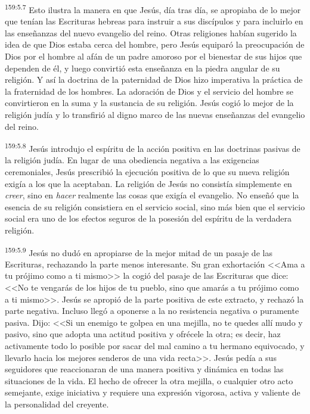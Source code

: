\par 
\textsuperscript{159:5.7} Esto ilustra la manera en que Jesús, día tras día, se apropiaba de lo mejor que tenían las Escrituras hebreas para instruir a sus discípulos y para incluirlo en las enseñanzas del nuevo evangelio del reino. Otras religiones habían sugerido la idea de que Dios estaba cerca del hombre, pero Jesús equiparó la preocupación de Dios por el hombre al afán de un padre amoroso por el bienestar de sus hijos que dependen de él, y luego convirtió esta enseñanza en la piedra angular de su religión. Y así la doctrina de la paternidad de Dios hizo imperativa la práctica de la fraternidad de los hombres. La adoración de Dios y el servicio del hombre se convirtieron en la suma y la sustancia de su religión. Jesús cogió lo mejor de la religión judía y lo transfirió al digno marco de las nuevas enseñanzas del evangelio del reino.

\par 
\textsuperscript{159:5.8} Jesús introdujo el espíritu de la acción positiva en las doctrinas pasivas de la religión judía. En lugar de una obediencia negativa a las exigencias ceremoniales, Jesús prescribió la ejecución positiva de lo que su nueva religión exigía a los que la aceptaban. La religión de Jesús no consistía simplemente en \textit{creer}, sino en \textit{hacer} realmente las cosas que exigía el evangelio. No enseñó que la esencia de su religión consistiera en el servicio social, sino más bien que el servicio social era uno de los efectos seguros de la posesión del espíritu de la verdadera religión.

\par 
\textsuperscript{159:5.9} Jesús no dudó en apropiarse de la mejor mitad de un pasaje de las Escrituras, rechazando la parte menos interesante. Su gran exhortación <<Ama a tu prójimo como a ti mismo>> la cogió del pasaje de las Escrituras que dice: <<No te vengarás de los hijos de tu pueblo, sino que amarás a tu prójimo como a ti mismo>>. Jesús se apropió de la parte positiva de este extracto, y rechazó la parte negativa. Incluso llegó a oponerse a la no resistencia negativa o puramente pasiva. Dijo: <<Si un enemigo te golpea en una mejilla, no te quedes allí mudo y pasivo, sino que adopta una actitud positiva y ofrécele la otra; es decir, haz activamente todo lo posible por sacar del mal camino a tu hermano equivocado, y llevarlo hacia los mejores senderos de una vida recta>>. Jesús pedía a sus seguidores que reaccionaran de una manera positiva y dinámica en todas las situaciones de la vida. El hecho de ofrecer la otra mejilla, o cualquier otro acto semejante, exige iniciativa y requiere una expresión vigorosa, activa y valiente de la personalidad del creyente.

